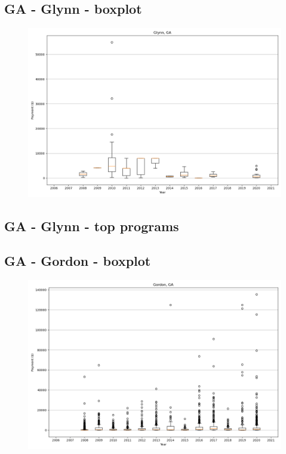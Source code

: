 \subsection*{GA - Glynn - boxplot}
\begin{figure}[h]
\centering
\includegraphics[width=7in]{../output/boxplots/counties/Glynn-GA_boxplot.png}
\end{figure}


\subsection*{GA - Glynn - top programs}

\newpage
\subsection*{GA - Gordon - boxplot}
\begin{figure}[h]
\centering
\includegraphics[width=7in]{../output/boxplots/counties/Gordon-GA_boxplot.png}
\end{figure}


